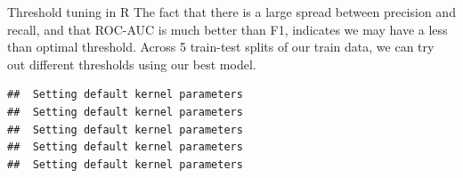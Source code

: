 \documentclass[
  10pt,
  ignorenonframetext,
  aspectratio=169]{beamer}
\newenvironment{Shaded}{\begin{snugshade}}{\end{snugshade}}
\newcommand{\AttributeTok}[1]{\textcolor[rgb]{0.80,0.80,0.80}{#1}}
\newcommand{\ControlFlowTok}[1]{\textcolor[rgb]{0.94,0.87,0.69}{#1}}
\newcommand{\DecValTok}[1]{\textcolor[rgb]{0.86,0.86,0.80}{#1}}
\newcommand{\FloatTok}[1]{\textcolor[rgb]{0.75,0.75,0.82}{#1}}
\newcommand{\FunctionTok}[1]{\textcolor[rgb]{0.94,0.94,0.56}{#1}}
\newcommand{\NormalTok}[1]{\textcolor[rgb]{0.80,0.80,0.80}{#1}}
\newcommand{\OtherTok}[1]{\textcolor[rgb]{0.94,0.94,0.56}{#1}}
\newcommand{\SpecialCharTok}[1]{\textcolor[rgb]{0.86,0.64,0.64}{#1}}
\newcommand{\StringTok}[1]{\textcolor[rgb]{0.80,0.58,0.58}{#1}}
\begin{document}
\begin{frame}[fragile]{Threshold tuning in R}
\protect\hypertarget{threshold-tuning-in-r}{}
The fact that there is a large spread between precision and recall, and
that ROC-AUC is much better than F1, indicates we may have a less than
optimal threshold. Across 5 train-test splits of our train data, we can
try out different thresholds using our best model.

\medskip
\scriptsize

\begin{Shaded}
\end{Shaded}

\begin{verbatim}
##  Setting default kernel parameters  
##  Setting default kernel parameters  
##  Setting default kernel parameters  
##  Setting default kernel parameters  
##  Setting default kernel parameters
\end{verbatim}
\end{frame}
\end{document}
